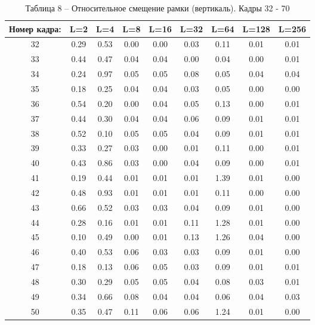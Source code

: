 \begin{table}[h!]
\caption*{Таблица 8 -- Относительное смещение рамки (вертикаль). Кадры 32 - 70}
\begin{tabular}{|c|c|c|c|c|c|c|c|c|}
\hline
Номер кадра: & L=2  & L=4  & L=8  & L=16 & L=32 & L=64 & L=128 & L=256 \\ \hline
32           & 0.29 & 0.53 & 0.00 & 0.00 & 0.03 & 0.11 & 0.01  & 0.01  \\ \hline
33           & 0.44 & 0.47 & 0.04 & 0.04 & 0.00 & 0.04 & 0.00  & 0.01  \\ \hline
34           & 0.24 & 0.97 & 0.05 & 0.05 & 0.08 & 0.05 & 0.04  & 0.04  \\ \hline
35           & 0.18 & 0.25 & 0.04 & 0.04 & 0.03 & 0.05 & 0.00  & 0.00  \\ \hline
36           & 0.54 & 0.20 & 0.00 & 0.04 & 0.05 & 0.13 & 0.00  & 0.01  \\ \hline
37           & 0.44 & 0.30 & 0.04 & 0.04 & 0.06 & 0.09 & 0.01  & 0.01  \\ \hline
38           & 0.52 & 0.10 & 0.05 & 0.05 & 0.04 & 0.09 & 0.01  & 0.01  \\ \hline
39           & 0.33 & 0.27 & 0.03 & 0.00 & 0.01 & 0.11 & 0.00  & 0.01  \\ \hline
40           & 0.43 & 0.86 & 0.03 & 0.00 & 0.04 & 0.09 & 0.00  & 0.01  \\ \hline
41           & 0.19 & 0.44 & 0.01 & 0.01 & 0.01 & 1.39 & 0.01  & 0.00  \\ \hline
42           & 0.48 & 0.93 & 0.01 & 0.01 & 0.01 & 0.11 & 0.00  & 0.00  \\ \hline
43           & 0.66 & 0.52 & 0.03 & 0.03 & 0.04 & 0.09 & 0.01  & 0.00  \\ \hline
44           & 0.28 & 0.16 & 0.01 & 0.01 & 0.11 & 1.28 & 0.01  & 0.00  \\ \hline
45           & 0.10 & 0.49 & 0.00 & 0.01 & 0.13 & 1.26 & 0.04  & 0.00  \\ \hline
46           & 0.40 & 0.53 & 0.06 & 0.03 & 0.03 & 0.09 & 0.01  & 0.00  \\ \hline
47           & 0.18 & 0.13 & 0.06 & 0.05 & 0.03 & 0.09 & 0.01  & 0.01  \\ \hline
48           & 0.30 & 0.29 & 0.05 & 0.05 & 0.04 & 0.08 & 0.03  & 0.01  \\ \hline
49           & 0.34 & 0.66 & 0.08 & 0.04 & 0.04 & 0.06 & 0.04  & 0.03  \\ \hline
50           & 0.35 & 0.47 & 0.11 & 0.06 & 0.06 & 1.24 & 0.01  & 0.00  \\ \hline

\end{tabular}
\end{table}
